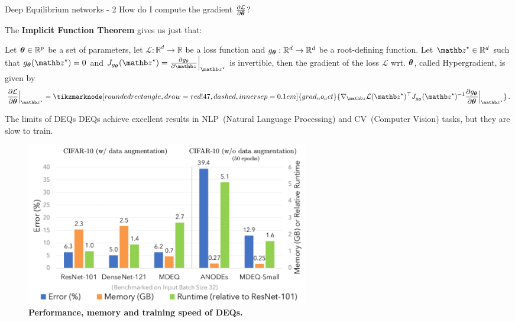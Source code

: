 \begin{frame}{Deep Equilibrium networks - 2}
    How do I compute the gradient $\frac{\partial \mathcal{L}}{\partial {\ensuremath{\boldsymbol{\theta}}}}$?
    \pause

    The \textbf{Implicit Function Theorem} gives us just that:
    \begin{theorem}
        Let ${\boldsymbol{\theta}} \in \mathbb{R}^p$ be a set of parameters, let $\mathcal{L}: \mathbb{R}^d \rightarrow \mathbb{R}$ be a loss function and $g_{{\boldsymbol{\theta}}}: \mathbb{R}^d \rightarrow \mathbb{R}^d$ be a root-defining function.
Let $\zb^\star \in  \mathbb{R}^d$ such that $g_{\thetab}(\zb^\star) = 0$ and $J_{g_{\thetab}}(\zb^\star) = \frac{\partial g_{\theta}}{\partial \zb}\Bigr|_{\zb^\star}$ is invertible, then the gradient of the loss $\mathcal{L}$ wrt. ${\boldsymbol{\theta}}$, called Hypergradient, is given by
\begin{equation*}
    \frac{\partial \mathcal{L}}{\partial \thetab}\Bigr|_{\zb^\star} = \tikzmarknode[rounded rectangle, draw=red!47, dashed, inner sep=0.1em]{grad_no_act}{\nabla_\zb \mathcal{L}(\zb^\star)^\top J_{g_{\thetab}}(\zb^\star)^{-1} \frac{\partial g_{\thetab}}{\partial \thetab}\Bigr|_{\zb^\star}} \, .
\end{equation*}
    \end{theorem}
\end{frame}

\begin{frame}{The limits of DEQs}
    DEQs achieve excellent results in NLP~(Natural Language Processing) and CV~(Computer Vision) tasks, but they are slow to train.

    \begin{figure}
        \centering
        \includegraphics[width=0.6\textwidth]{Figures/shine_figures/deq_memory.png}
        \caption{\textbf{Performance, memory and training speed of DEQs.}~\citep{Bai2020MultiscaleModels}}
    \end{figure}
\end{frame}


